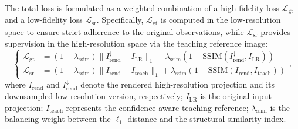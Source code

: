 \documentclass[runningheads]{llncs}
\begin{document}
The total loss is formulated as a weighted combination of a high-fidelity loss $\mathcal{L}_{\text{gt}}$ and a low-fidelity loss $\mathcal{L}_{\text{sr}}$. Specifically, $\mathcal{L}_{\text{gt}}$ is computed in the low-resolution space to ensure strict adherence to the original observations, while $\mathcal{L}_{\text{sr}}$ provides supervision in the high-resolution space via the teaching reference image:
\begin{equation}
\left\{
\begin{aligned}
\mathcal{L}_{\text{gt}} &= (1 - \lambda_{\text{ssim}}) \| I_{\text{rend}}^{\downarrow} - I_{\text{LR}} \|_1 + \lambda_{\text{ssim}} (1 - \text{SSIM}(I_{\text{rend}}^{\downarrow}, I_{\text{LR}})) \\[1.2ex]
\mathcal{L}_{\text{sr}} &= (1 - \lambda_{\text{ssim}}) \| I_{\text{rend}} - I_{\text{teach}} \|_1 + \lambda_{\text{ssim}} (1 - \text{SSIM}(I_{\text{rend}}, I_{\text{teach}}))
\end{aligned}
\right.,
\end{equation}
where $I_{\text{rend}}$ and $I_{\text{rend}}^{\downarrow}$ denote the rendered high-resolution projection and its downsampled low-resolution version, respectively; $I_{\text{LR}}$ is the original input projection; $I_{\text{teach}}$ represents the confidence-aware teaching reference; $\lambda_{\text{ssim}}$ is the balancing weight between the $\ell_1$ distance and the structural similarity index.
\end{document}
